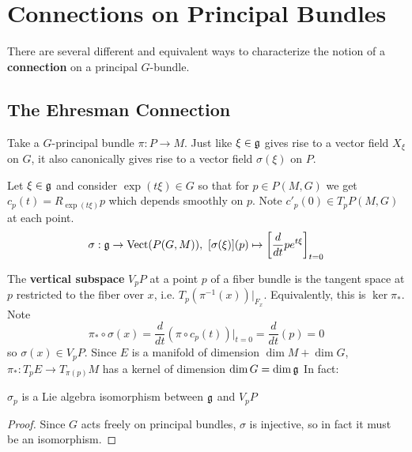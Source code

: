 		\section{Connections on Principal Bundles} %
		\label{sec:connections_on_principal_bundles}
		
		There are several different and equivalent ways to characterize the notion of a \textbf{connection} on a principal $G$-bundle. 
		
		\subsection{The Ehresman Connection}
		
		Take a $G$-principal bundle $\pi: P \rightarrow M$. 
		Just like $\xi \in \frak g$ gives rise to a vector field $X_\xi$ on $G$, it also canonically gives rise to a vector field $\sigma(\xi)$ on $P$.
		\begin{defn}
			Let $\xi \in \frak g$ and consider $\exp(t \xi) \in G$ so that for $p \in P(M,G)$ we get $c_p(t) = R_{\exp(t \xi)} p$ which depends smoothly on $p$. Note $c'_p(0) \in T_p P(M,G)$ at each point.
			\begin{equation}
				\sigma: \frak g \rightarrow \text{Vect}(P(G,M)), ~ [\sigma(\xi)](p) \mapsto \left[ \frac{d}{dt} p e^{t \xi}\right]_{t=0}
			\end{equation}
		\end{defn}
		The \textbf{vertical subspace} $V_p P$ at a point $p$ of a fiber bundle is the tangent space at $p$ restricted to the fiber over $x$, i.e. $T_p (\pi^{-1}(x))|_{F_x}$. Equivalently, this is $\ker \pi_*$. Note
		\begin{equation}
			\pi_* \circ \sigma(x) = \frac{d}{dt} (\pi \circ c_p(t))|_{t=0} = \frac{d}{dt} (p) = 0
		\end{equation} 
		so $\sigma(x) \in V_p P$. 
		Since $E$ is a manifold of dimension $\dim M + \dim G$, $\pi_*: T_pE \rightarrow T_{\pi(p)}M$ has a kernel of dimension $\dim G = \dim \frak g$
		In fact:
		\begin{prop}
			$\sigma_p$ is a Lie algebra isomorphism between $\frak g$ and $V_pP$
		\end{prop}
		 \begin{proof}
		 	Since $G$ acts freely on principal bundles, $\sigma$ is injective, so in fact it must be an isomorphism.
		 \end{proof}
	
